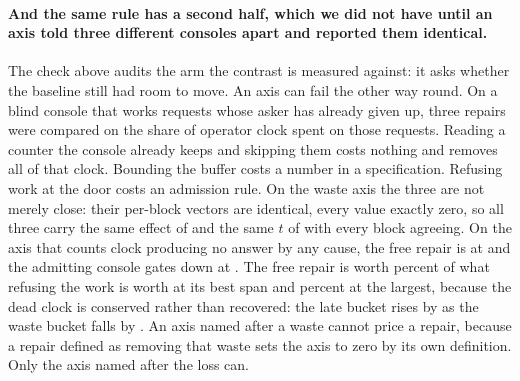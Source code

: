\documentclass[11pt]{article}
\begin{document}
\paragraph{And the same rule has a second half, which we did not have until an axis told three different consoles apart and reported them identical.} The check above audits the arm the contrast is measured against: it asks whether the baseline still had room to move. An axis can fail the other way round. On a blind console that works requests whose asker has already given up, three repairs were compared on the share of operator clock spent on those requests. Reading a counter the console already keeps and skipping them costs nothing and removes all of that clock. Bounding the buffer costs a number in a specification. Refusing work at the door costs an admission rule. On the waste axis the three are not merely close: their per-block vectors are identical, every value exactly zero, so all three carry the same effect of \GhStaleTwentyFour{} and the same $t$ of \GhStaleT{} with every block agreeing. On the axis that counts clock producing no answer by any cause, the free repair is \GhDeadDropsV{} at \GhDeadDropsEff{} and the admitting console gates down at \GhDeadAdmitsEff{}. The free repair is worth \GhPeakShare{} percent of what refusing the work is worth at its best span and \GhLastShare{} percent at the largest, because the dead clock is conserved rather than recovered: the late bucket rises by \GhLateTwentyFour{} as the waste bucket falls by \GhStaleTwentyFour{}. An axis named after a waste cannot price a repair, because a repair defined as removing that waste sets the axis to zero by its own definition. Only the axis named after the loss can.
\end{document}
